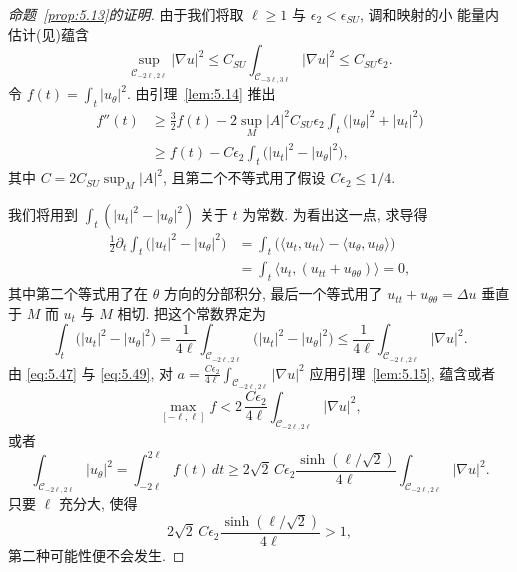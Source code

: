 \begin{proof}[命题~\ref{prop:5.13}的证明]
由于我们将取 $\ell\geq 1$ 与 $\epsilon_2<\epsilon_{SU}$, 调和映射的小
能量内估计(见)蕴含
\begin{equation}
\sup_{\mathcal{C}_{-2\ell,2\ell}}|\nabla u|^2
\leq C_{SU}\int_{\mathcal{C}_{-3\ell,3\ell}}|\nabla u|^2
\leq C_{SU}\epsilon_2.
\label{eq:5.46}
\end{equation}
令 $f(t)=\int_t|u_\theta|^2$. 由引理~\ref{lem:5.14} 推出
\begin{equation}
\begin{aligned}
f''(t)
&\geq\frac32f(t)-2\sup_M|A|^2C_{SU}\epsilon_2
 \int_t\bigl(|u_\theta|^2+|u_t|^2\bigr)\\
&\geq f(t)-C\epsilon_2\int_t\bigl(|u_t|^2-|u_\theta|^2\bigr),
\end{aligned}
\label{eq:5.47}
\end{equation}
其中 $C=2C_{SU}\sup_M|A|^2$, 且第二个不等式用了假设
$C\epsilon_2\leq 1/4$.

我们将用到 $\int_t(|u_t|^2-|u_\theta|^2)$ 关于 $t$ 为常数. 为看出这一点,
求导得
\begin{equation}
\begin{aligned}
\frac12\partial_t\int_t\bigl(|u_t|^2-|u_\theta|^2\bigr)
&=\int_t\bigl(\langle u_t,u_{tt}\rangle-\langle u_\theta,u_{t\theta}\rangle\bigr)\\
&=\int_t\bigl\langle u_t,(u_{tt}+u_{\theta\theta})\bigr\rangle=0,
\end{aligned}
\label{eq:5.48}
\end{equation}
其中第二个等式用了在 $\theta$ 方向的分部积分, 最后一个等式用了
$u_{tt}+u_{\theta\theta}=\Delta u$ 垂直于 $M$ 而 $u_t$ 与 $M$ 相切.
把这个常数界定为
\begin{equation}
\int_t\bigl(|u_t|^2-|u_\theta|^2\bigr)
=\frac1{4\ell}\int_{\mathcal{C}_{-2\ell,2\ell}}
\bigl(|u_t|^2-|u_\theta|^2\bigr)
\leq\frac1{4\ell}\int_{\mathcal{C}_{-2\ell,2\ell}}|\nabla u|^2.
\label{eq:5.49}
\end{equation}
由 \eqref{eq:5.47} 与 \eqref{eq:5.49}, 对
$a=\frac{C\epsilon_2}{4\ell}\int_{\mathcal{C}_{-2\ell,2\ell}}|\nabla u|^2$
应用引理~\ref{lem:5.15}, 蕴含或者
\begin{equation}
\max_{[-\ell,\ell]}f<2\,\frac{C\epsilon_2}{4\ell}
\int_{\mathcal{C}_{-2\ell,2\ell}}|\nabla u|^2,
\label{eq:5.50}
\end{equation}
或者
\begin{equation}
\int_{\mathcal{C}_{-2\ell,2\ell}}|u_\theta|^2
=\int_{-2\ell}^{2\ell}f(t)\,dt
\geq 2\sqrt2\,C\epsilon_2\frac{\sinh(\ell/\sqrt2)}{4\ell}
\int_{\mathcal{C}_{-2\ell,2\ell}}|\nabla u|^2.
\label{eq:5.51}
\end{equation}
只要 $\ell$ 充分大, 使得
\begin{equation}
2\sqrt2\,C\epsilon_2\frac{\sinh(\ell/\sqrt2)}{4\ell}>1,
\label{eq:5.52}
\end{equation}
第二种可能性便不会发生.


\end{proof}

